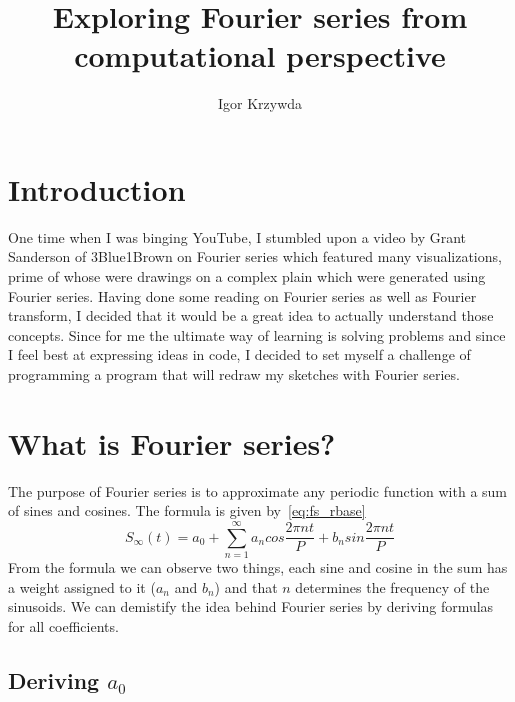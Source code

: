 \documentclass[titlepage]{article}
\title{Exploring Fourier series from computational perspective}
\author{Igor Krzywda}
\begin{document}
\maketitle
\tableofcontents
\pagebreak

\section{Introduction}

    One time when I was binging YouTube, I stumbled upon a video by Grant Sanderson
    of 3Blue1Brown on Fourier series which featured many visualizations, prime of
    whose were drawings on a complex plain which were generated using Fourier
    series. Having done some reading on Fourier series as well as Fourier transform, 
    I decided that it would be a great idea to actually understand those concepts.
    Since for me the ultimate way of learning is solving problems and since I feel
    best at expressing ideas in code, I decided to set myself a challenge of 
    programming a program that will redraw my sketches with Fourier series.

\section{What is Fourier series?}

    The purpose of Fourier series is to approximate any periodic function with
    a sum of sines and cosines. The formula is given by~\eqref{eq:fs_rbase}
    \begin{equation} \label{eq:fs_rbase}
        S_\infty(t) = a_0 + \sum_{n=1}^{\infty}a_ncos\frac{2\pi nt}{P} + b_n%
            sin\frac{2\pi nt}{P}
    \end{equation}
    From the formula we can observe two things, each sine and cosine in the sum
    has a weight assigned to it ($a_n$ and $b_n$) and that $n$ determines the 
    frequency of the sinusoids. We can demistify the idea behind Fourier series
    by deriving formulas for all coefficients.

\subsection{Deriving $a_0$}
    
\end{document}
